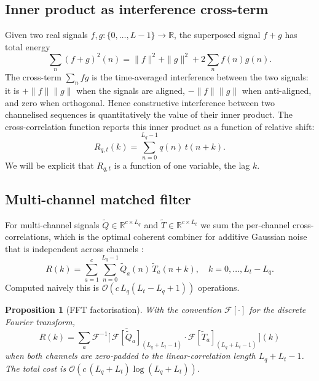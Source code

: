 \documentclass[11pt,a4paper]{article}
\newtheorem{proposition}[theorem]{Proposition}
\theoremstyle{definition}
\theoremstyle{remark}
\newcommand{\bigO}{\mathcal{O}}
\newcommand{\R}{\mathbb{R}}
\newcommand{\F}{\mathcal{F}}
\begin{document}
\subsection{Inner product as interference cross-term}

Given two real signals $f, g : \{0, \dots, L - 1\} \to \R$, the
superposed signal $f + g$ has total energy
\begin{equation}
    \sum_n (f + g)^2(n) = \|f\|^2 + \|g\|^2 + 2 \sum_n f(n) g(n).
\end{equation}
The cross-term $\sum_n f g$ is the time-averaged interference between
the two signals: it is $+\|f\| \|g\|$ when the signals are aligned,
$-\|f\| \|g\|$ when anti-aligned, and zero when orthogonal. Hence
constructive interference between two channelised sequences is
quantitatively the value of their inner product. The cross-correlation
function reports this inner product as a function of relative shift:
\begin{equation}
    R_{q,t}(k) = \sum_{n=0}^{L_q - 1} q(n) \, t(n + k).
\end{equation}
We will be explicit that $R_{q, t}$ is a function of one variable, the
lag $k$.

\subsection{Multi-channel matched filter}

For multi-channel signals $\tilde Q \in \R^{c \times L_q}$ and
$\tilde T \in \R^{c \times L_t}$ we sum the per-channel cross-correlations,
which is the optimal coherent combiner for additive Gaussian noise that
is independent across channels \citep{vantrees2001, kay1998}:
\begin{equation}
    R(k) = \sum_{a=1}^{c} \sum_{n=0}^{L_q - 1} \tilde Q_{a}(n) \, \tilde T_{a}(n+k),
    \quad k = 0, \dots, L_t - L_q.
    \label{eq:multich}
\end{equation}
Computed naively this is $\bigO(c \, L_q (L_t - L_q + 1))$ operations.

\begin{proposition}[FFT factorisation]
\label{prop:fft}
With the convention $\F[\cdot]$ for the discrete Fourier transform,
\begin{equation}
    R(k)
    = \sum_a \F^{-1}\!\Big[\, \overline{\F[\tilde Q_a]}_{(L_q + L_t - 1)} \cdot \F[\tilde T_a]_{(L_q + L_t - 1)} \,\Big](k)
\end{equation}
when both channels are zero-padded to the linear-correlation length
$L_q + L_t - 1$. The total cost is $\bigO\!\left( c \, (L_q + L_t) \log(L_q + L_t) \right)$.
\end{proposition}
\end{document}
